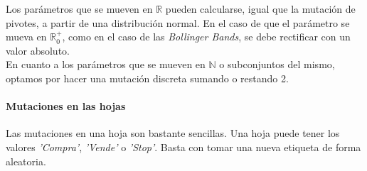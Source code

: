 Los par\'ametros que se mueven en $\mathbb{R}$ pueden calcularse, igual que la mutaci\'on de pivotes, a partir de una distribuci\'on normal. En el caso de que el par\'ametro se mueva en $\mathbb{R}_0^+$, como en el caso de las \textit{Bollinger Bands}, se debe rectificar con un valor absoluto.\\

En cuanto a los par\'ametros que se mueven en $\mathbb{N}$ o subconjuntos del mismo, optamos por hacer una mutaci\'on discreta sumando o restando 2. \\

\paragraph{Mutaciones en las hojas}
Las mutaciones en una hoja son bastante sencillas. Una hoja puede tener los valores \textit{'Compra'}, \textit{'Vende'} o \textit{'Stop'}. Basta con tomar una nueva etiqueta de forma aleatoria.\\


